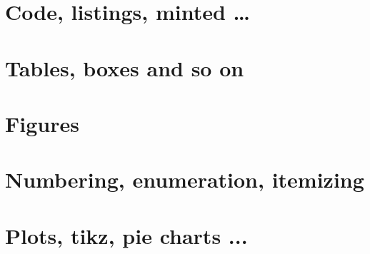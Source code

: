 \documentclass[14pt]{extreport}
\begin{document}
\chapter{Code, listings, minted \dots}



\chapter{Tables, boxes and so on}



\chapter{Figures}



\chapter{Numbering, enumeration, itemizing}



\chapter{Plots, tikz, pie charts ...}



%


%

%
 
\end{document}
